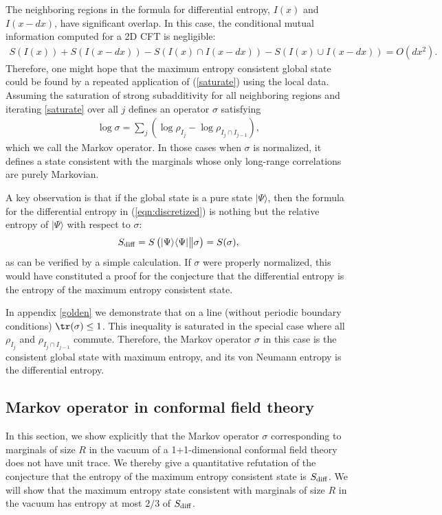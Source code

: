 \documentclass[12pt]{article}
\newcommand{\la}{\langle}
\newcommand{\ra}{\rangle}
\newcommand{\rb}{\right)}
\newcommand{\lb}{\left(}
\def\bea{\begin{eqnarray}}
\def\eea{\end{eqnarray}}
\def\sdiff{S_{\rm diff}}
\begin{document}
The neighboring regions in the formula for differential entropy, $I(x)$ and $I(x-dx)$, have significant overlap. In this case, the conditional mutual information computed for a 2D CFT is negligible:
\bea
S(I(x))+S(I(x-dx))-S(I(x)\cap I(x-dx))-S(I(x)\cup I(x-dx))= O(dx^2).
\eea
Therefore, one might hope that the maximum entropy consistent global state could be found by a repeated application of (\ref{saturate}) using the local data. Assuming the saturation of strong subadditivity for all neighboring regions and iterating \eqref{saturate} over all $j$ defines an operator $\sigma$ satisfying
\bea\label{rho_global}
\log\sigma=\sum_j\lb \log\rho_{I_j}-\log\rho_{I_j\cap I_{j-1}}\rb,
\eea
which we call the Markov operator. In those cases when $\sigma$ is normalized, it defines a state consistent with the marginals whose only long-range correlations are purely Markovian.

A key observation is that if the global state is a pure state $|\Psi\ra$, then the formula for the differential entropy in (\ref{eqn:discretized}) is nothing but the relative entropy of $|\Psi\ra$ with respect to $\sigma$:
\bea
\sdiff=S\left(|\Psi\ra\la\Psi|\big\|\sigma\right)=S(\sigma),
\eea
as can be verified by a simple calculation.
If $\sigma$ were properly normalized, this would have constituted a proof for the conjecture that the differential entropy is the entropy of the maximum entropy consistent state.

In appendix \ref{golden} we demonstrate that on a line (without periodic boundary conditions) $\tr(\sigma)\leq 1$. This inequality is saturated in the special case where all $\rho_{I_j}$ and $\rho_{{I_j}\cap I_{j-1}}$ commute. Therefore, the Markov operator $\sigma$ in this case is the consistent global state with maximum entropy, and its von Neumann entropy is the differential entropy.

\subsection{Markov operator in conformal field theory}

In this section, we show explicitly that the Markov operator $\sigma$ corresponding to marginals of size $R$ in the vacuum of a 1+1-dimensional conformal field theory does not have unit trace. We thereby give a quantitative refutation of the conjecture that the entropy of the maximum entropy consistent state is $\sdiff$. We will show that the maximum entropy state consistent with marginals of size $R$ in the vacuum has entropy at most $2/3$ of $\sdiff$.
\end{document}
